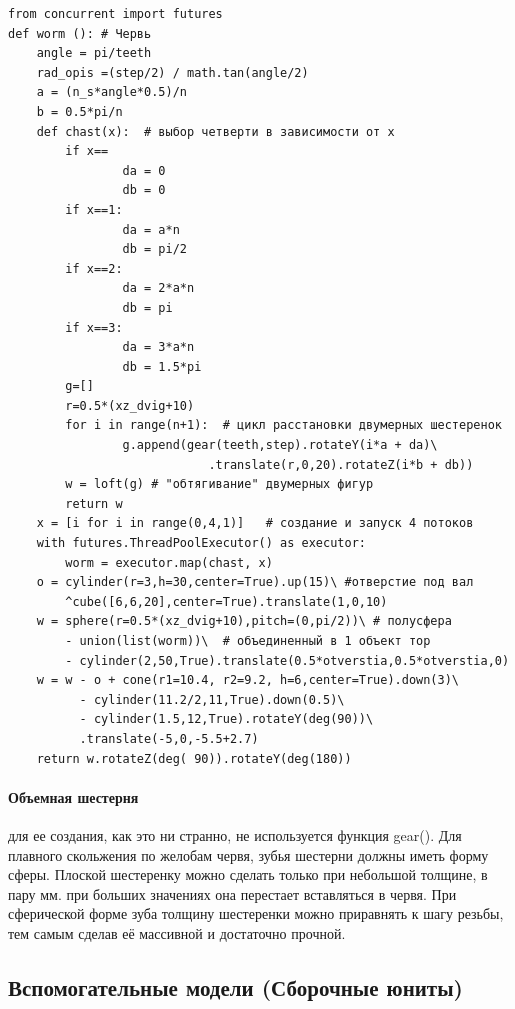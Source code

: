 \newpage
\begin{lstlisting}[style=python,caption=Код функции создающей червя]
from concurrent import futures
def worm (): # Червь
    angle = pi/teeth
    rad_opis =(step/2) / math.tan(angle/2)
    a = (n_s*angle*0.5)/n
    b = 0.5*pi/n
    def chast(x):  # выбор четверти в зависимости от х
        if x==
                da = 0
                db = 0
        if x==1:
                da = a*n
                db = pi/2
        if x==2:
                da = 2*a*n
                db = pi
        if x==3:
                da = 3*a*n
                db = 1.5*pi
        g=[]
        r=0.5*(xz_dvig+10)
        for i in range(n+1):  # цикл расстановки двумерных шестеренок 
                g.append(gear(teeth,step).rotateY(i*a + da)\
                            .translate(r,0,20).rotateZ(i*b + db))
        w = loft(g) # "обтягивание" двумерных фигур  
        return w
    x = [i for i in range(0,4,1)]   # создание и запуск 4 потоков
    with futures.ThreadPoolExecutor() as executor: 
        worm = executor.map(chast, x)
    o = cylinder(r=3,h=30,center=True).up(15)\ #отверстие под вал  
        ^cube([6,6,20],center=True).translate(1,0,10)
    w = sphere(r=0.5*(xz_dvig+10),pitch=(0,pi/2))\ # полусфера
        - union(list(worm))\  # объединенный в 1 объект тор
        - cylinder(2,50,True).translate(0.5*otverstia,0.5*otverstia,0)
    w = w - o + cone(r1=10.4, r2=9.2, h=6,center=True).down(3)\
          - cylinder(11.2/2,11,True).down(0.5)\
          - cylinder(1.5,12,True).rotateY(deg(90))\
          .translate(-5,0,-5.5+2.7)
    return w.rotateZ(deg( 90)).rotateY(deg(180))
 \end{lstlisting}
 
\paragraph{Объемная шестерня} для ее создания, как это ни странно, не используется функция gear(). Для плавного скольжения по желобам червя, зубья шестерни должны иметь форму сферы. Плоской шестеренку можно сделать только при небольшой толщине, в пару мм. при больших значениях она перестает вставляться в червя. При сферической форме зуба толщину шестеренки можно приравнять к шагу резьбы, тем самым сделав её массивной и достаточно прочной. 

\subsection{Вспомогательные модели (Сборочные юниты)}


